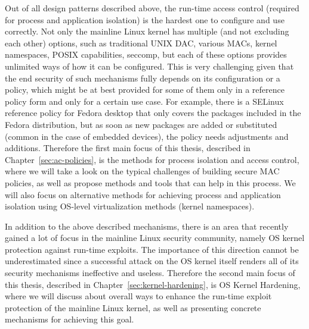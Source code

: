 
Out of all design patterns described above, the run-time access control (required for process and application isolation) is the hardest one to configure and use correctly. Not only the mainline Linux kernel has multiple (and not excluding each other) options, such as traditional UNIX DAC, various MACs, kernel namespaces, POSIX capabilities, seccomp, but each of these options provides unlimited ways of how it can be configured. This is very challenging given that the end security of such mechanisms fully depends on its configuration or a policy, which might be at best provided for some of them only in a reference policy form and only for a certain use case. For example, there is a SELinux reference policy for Fedora desktop that only covers the packages included in the Fedora distribution, but as soon as new packages are added or substituted (common in the case of embedded devices), the policy needs adjustments and additions. Therefore the first main focus of this thesis, described in Chapter~\ref{sec:ac-policies}, is the methods for process isolation and access control, where we will take a look on the typical challenges of building secure MAC policies, as well as propose methods and tools that can help in this process. We will also focus on alternative methods for achieving process and application isolation using OS-level virtualization methods (kernel namespaces). 

In addition to the above described mechanisms, there is an area that recently gained a lot of focus in the mainline Linux security community, namely OS kernel protection against run-time exploits. The importance of this direction cannot be underestimated since a successful attack on the OS kernel itself renders all of its security mechanisms ineffective and useless. Therefore the second main focus of this thesis, described in Chapter~\ref{sec:kernel-hardening}, is OS Kernel Hardening, where we will discuss about overall ways to enhance the run-time exploit protection of the mainline Linux kernel, as well as presenting concrete mechanisms for achieving this goal. 
 